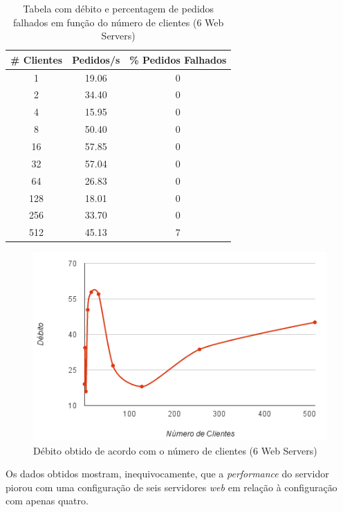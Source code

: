 
\begin{table}[!h]
\centering
\begin{tabular}{|c|c|c|}
\hline
\textbf{\# Clientes} & \textbf{Pedidos/s} & \textbf{\% Pedidos Falhados} \\ \hline
1 & 19.06 & 0 \\ \hline
2 & 34.40 & 0 \\ \hline
4 & 15.95 & 0 \\ \hline
8 & 50.40 & 0 \\ \hline
16 & 57.85 & 0 \\ \hline
32 & 57.04 & 0 \\ \hline
64 & 26.83 & 0 \\ \hline
128 & 18.01 & 0 \\ \hline
256 & 33.70 & 0 \\ \hline
512 & 45.13 & 7 \\ \hline
\end{tabular}
\caption{Tabela com débito e percentagem de pedidos falhados em função do número de clientes (6 Web Servers)}
\end{table}

\begin{figure}[!h]
\centering
\includegraphics[scale=.6]{img/ab/web6.png}
\caption{Débito obtido de acordo com o número de clientes (6 Web Servers)}
\end{figure}

\newpage
{}

Os dados obtidos mostram, inequivocamente, que a \textit{performance} do servidor piorou com uma configuração de seis servidores \textit{web} em relação à configuração com apenas quatro. \\

